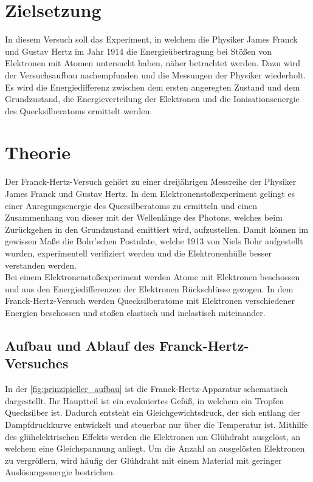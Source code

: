 \section{Zielsetzung}
\label{sec:zielsetzung}

    In diesem Versuch soll das Experiment, in welchem die Physiker James Franck und Gustav Hertz im Jahr 1914 die Energieübertragung bei Stößen von Elektronen mit 
    Atomen untersucht haben, näher betrachtet werden. Dazu wird der Versuchsaufbau nachempfunden und die Messungen der Physiker wiederholt. Es wird die 
    Energiedifferenz zwischen dem ersten angeregten Zustand und dem Grundzustand, die Energieverteilung der Elektronen und die Ionisationsenergie des 
    Quecksilberatoms ermittelt werden. 

\section{Theorie}
\label{sec:Theorie}

    Der Franck-Hertz-Versuch gehört zu einer dreijährigen Messreihe der Physiker James Franck und Gustav Hertz. In dem Elektronenstoßexperiment gelingt es einer
    Anregungsenergie des Quersilberatoms zu ermitteln und einen Zusammenhang von dieser mit der Wellenlänge des Photons, welches beim Zurückgehen in den 
    Grundzustand emittiert wird, aufzustellen. Damit können im gewissen Maße die Bohr'schen Postulate, welche 1913 von Niels Bohr aufgestellt wurden, experimentell verifiziert 
    werden und die Elektronenhülle besser verstanden werden. \\
    
    \noindent Bei einem Elektronenstoßexperiment werden Atome mit Elektronen beschossen und aus den Energiedifferenzen der Elektronen Rückschlüsse gezogen. 
    In dem Franck-Hertz-Versuch werden Quecksilberatome mit Elektronen verschiedener Energien beschossen und stoßen elastisch und inelastisch miteinander. 


\subsection{Aufbau und Ablauf des Franck-Hertz-Versuches}

    In der \autoref{fig:prinzipieller_aufbau} ist die Franck-Hertz-Apparatur schematisch dargestellt. Ihr Hauptteil ist ein evakuiertes Gefäß, in welchem ein 
    Tropfen Quecksilber ist. Dadurch entsteht ein Gleichgewichtsdruck, der sich entlang der Dampfdruckkurve entwickelt und steuerbar nur über die Temperatur ist. 
    Mithilfe des glühelektrischen Effekts werden die Elektronen am Glühdraht ausgelöst, an welchem eine Gleichspannung anliegt. Um die Anzahl an ausgelösten 
    Elektronen zu vergrößern, wird häufig der Glühdraht mit einem Material mit geringer Auslösungsenergie bestrichen. 

